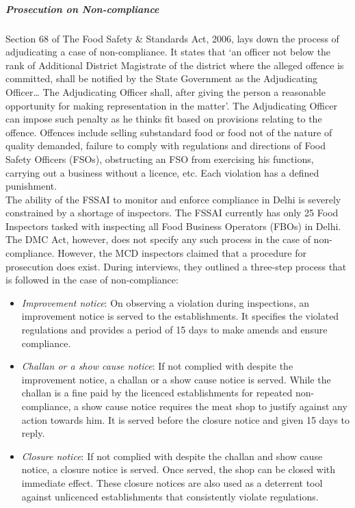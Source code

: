 \documentclass[a4paper, 12pt]{article}
\begin{document}
\subparagraph{Prosecution on Non-compliance}

Section 68 of The Food Safety \& Standards Act, 2006, lays down the process of adjudicating a case of non-compliance. It states that ‘an officer not below the rank of Additional District Magistrate of the district where the alleged offence is committed, shall be notified by the State Government as the Adjudicating Officer… The Adjudicating Officer shall, after giving the person a reasonable opportunity for making representation in the matter’. The Adjudicating Officer can impose such penalty as he thinks fit based on provisions relating to the offence. Offences include selling substandard food or food not of the nature of quality demanded, failure to comply with regulations and directions of Food Safety Officers (FSOs), obstructing an FSO from exercising his functions, carrying out a business without a licence, etc. Each violation has a defined punishment.\\

The ability of the FSSAI to monitor and enforce compliance in Delhi is severely constrained by a shortage of inspectors. The FSSAI currently has only 25 Food Inspectors tasked with inspecting all Food Business Operators (FBOs) in Delhi.\\

The DMC Act, however, does not specify any such process in the case of non-compliance. However, the MCD inspectors claimed that a procedure for prosecution does exist. During interviews, they outlined a three-step process that is followed in the case of non-compliance:\\

\begin{itemize}
\item \textit{Improvement notice}: On observing a violation during inspections, an improvement notice is served to the establishments. It specifies the violated regulations and provides a period of 15 days to make amends and ensure compliance.
\item \textit{Challan or a show cause notice}: If not complied with despite the improvement notice, a challan or a show cause notice is served. While the challan is a fine paid by the licenced establishments for repeated non-compliance, a show cause notice requires the meat shop to justify against any action towards him. It is served before the closure notice and given 15 days to reply. 
\item \textit{Closure notice}: If not complied with despite the challan and show cause notice, a closure notice is served. Once served, the shop can be closed with immediate effect. These closure notices are also used as a deterrent tool against unlicenced establishments that consistently violate regulations. 
\end{itemize}
\end{document}

